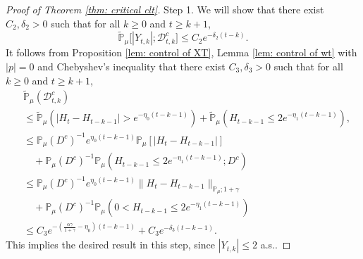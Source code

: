 \documentclass[12pt,a4paper]{amsart}
\theoremstyle{plain}
\theoremstyle{definition}
\numberwithin{equation}{section}
\begin{document}
\begin{proof}[Proof of Theorem \ref{thm: critical clt}]
    Step 1. We will show that there exist $C_2,\delta_2 >0$ such that for all $k \geq 0$ and $t\geq k+1$,
\begin{equation}
\label{thm121}
    \mathbb{\tilde{P}}_{\mu}\big[|Y_{t,k}|;\mathcal{D}^c_{t,k}\big]
    \leq C_2 e^{-\delta_2 (t-k)}.
\end{equation}
    It follows from Proposition \ref{lem: control of XT}, Lemma \ref{lem: control of wt} with $|p|=0$ and Chebyshev's inequality that there exist $C_3, \delta_3>0$ such that for all $k \geq 0$ and $t\geq k+1$,
\begin{align}
\label{eq: prob of Dtkc}
    &\mathbb{\tilde{P}}_{\mu}(\mathcal{D}_{t,k}^c)
    \\&\leq \mathbb{\tilde{P}}_{\mu}(|H_t-H_{t-k-1}| > e^{-\eta_0 (t-k-1)})+\mathbb{\tilde{P}}_{\mu}(H_{t-k-1}\leq 2e^{-\eta_1(t-k-1)}),
    \\&\leq \mathbb{P}_{\mu}(D^c)^{-1}e^{\eta_0(t-k-1)}\mathbb{P}_{\mu}[|H_t-H_{t-k-1}|]
    \\&\quad +\mathbb{P}_{\mu}(D^c)^{-1} \mathbb P_\mu(H_{t-k-1}\leq 2e^{-\eta_1(t-k-1)}; D^c)
    \\&\leq \mathbb{P}_{\mu}(D^c)^{-1}  e^{\eta_0(t-k-1)}\|H_t - H_{t-k-1}\|_{\mathbb P_\mu; 1+\gamma}
    \\&\quad + \mathbb{P}_{\mu}(D^c)^{-1} \mathbb P_\mu(0<H_{t-k-1}\leq 2e^{-\eta_1(t-k-1)})
    \\&\leq C_3 e^{-(\frac{\alpha \gamma}{1+\gamma} - \eta_0)(t-k-1)}+C_3 e^{-\delta_3(t-k-1)}.
\end{align}
    This implies the desired result in this step, since $|Y_{t,k}| \leq 2$ a.s..


\end{proof}
\end{document}
